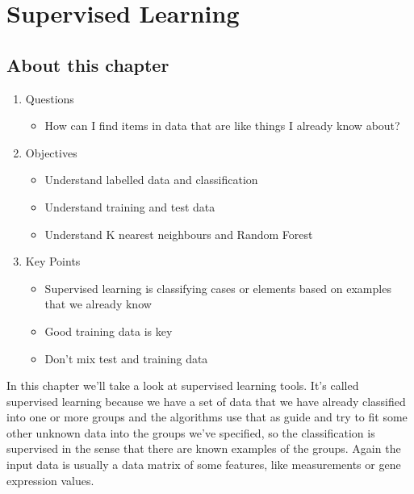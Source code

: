 \documentclass[
]{book}
\providecommand{\tightlist}{%
  \setlength{\itemsep}{0pt}\setlength{\parskip}{0pt}}
\begin{document}
\hypertarget{supervised-learning}{%
\chapter{Supervised Learning}\label{supervised-learning}}

\hypertarget{about-this-chapter-2}{%
\section{About this chapter}\label{about-this-chapter-2}}

\begin{enumerate}
\def\labelenumi{\arabic{enumi}.}
\tightlist
\item
  Questions

  \begin{itemize}
  \tightlist
  \item
    How can I find items in data that are like things I already know about?
  \end{itemize}
\item
  Objectives

  \begin{itemize}
  \tightlist
  \item
    Understand labelled data and classification
  \item
    Understand training and test data
  \item
    Understand K nearest neighbours and Random Forest
  \end{itemize}
\item
  Key Points

  \begin{itemize}
  \tightlist
  \item
    Supervised learning is classifying cases or elements based on examples that we already know
  \item
    Good training data is key
  \item
    Don't mix test and training data
  \end{itemize}
\end{enumerate}

In this chapter we'll take a look at supervised learning tools. It's called supervised learning because we have a set of data that we have already classified into one or more groups and the algorithms use that as guide and try to fit some other unknown data into the groups we've specified, so the classification is supervised in the sense that there are known examples of the groups. Again the input data is usually a data matrix of some features, like measurements or gene expression values.
\end{document}
